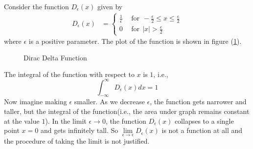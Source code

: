 


	Consider the function $D_\epsilon(x)$ given by
	\begin{eqnarray}
	D_\epsilon(x) &= 
		\begin{cases}
			\frac{1}{\epsilon} \ \ &\text{for} \ \  -\frac{\epsilon}{2} \leq x \leq \frac{\epsilon}{2} \\
			0 \ \ &\text{for} \ \  |x| > \frac{\epsilon}{2} 
		\end{cases}
	\end{eqnarray}
	where $\epsilon$ is a positive parameter. The plot of the function is shown in figure (\ref{fig.cpt1.figure1}).
	
	\begin{figure}
		\centering
		\caption{Dirac Delta Function}
		\label{fig.cpt1.figure1}
	\end{figure}
	
	The integral of the function with respect to $x$ is $1$, i.e.,
	\begin{equation}
		\int_{-\infty}^{\infty} D_\epsilon(x) dx = 1
	\end{equation}
	Now imagine making $\epsilon$ smaller. As we decrease $\epsilon$, the function gets narrower and taller, but the integral of the function(i.e., the area under graph remains constant at the value $1$).
	In the limit $\epsilon \rightarrow 0$, the function $D_\epsilon(x)$ collapses to a single  point $x=0$ and gets infinitely tall. So $\lim\limits_{\epsilon \rightarrow \epsilon} D_\epsilon(x)$ is not a function at all and the procedure of taking the limit is not justified.
	\\
	
